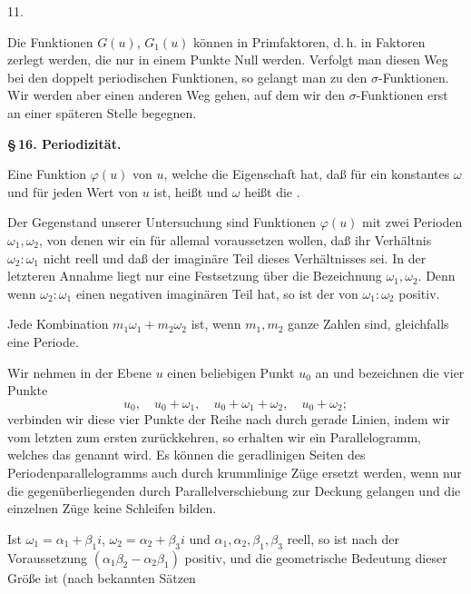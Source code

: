 
11. 

Die Funktionen $G(u)$, $G_1(u)$ können in Primfaktoren, d.\,h. in Faktoren zerlegt werden, die nur in einem Punkte Null werden. Verfolgt man diesen Weg bei den doppelt periodischen Funktionen, so gelangt man zu den  $\sigma$-Funktionen. Wir werden aber einen anderen Weg gehen, auf dem wir den $\sigma$-Funktionen erst an einer späteren Stelle begegnen.

\begin{center}
\textbf{\S\,16. Periodizit\"at.}
\end{center}

Eine Funktion $\varphi(u)$ von $u$, welche die Eigenschaft hat, daß für ein konstantes $\omega$ und für jeden Wert von $u$
ist, heißt  und $\omega$ heißt die .

Der Gegenstand unserer Untersuchung sind Funktionen $\varphi(u)$ mit zwei Perioden $\omega_1, \omega_2$, von denen wir ein für allemal voraussetzen wollen, daß ihr Verhältnis $\omega_2:\omega_1$ nicht reell und daß der imaginäre Teil dieses Verhältnisses  sei. In der letzteren Annahme liegt nur eine Festsetzung über die Bezeichnung $\omega_1, \omega_2$. Denn wenn $\omega_2:\omega_1$ einen negativen imaginären Teil hat, so ist der von $\omega_1:\omega_2$ positiv.

Jede Kombination $m_1\omega_1 + m_2\omega_2$ ist, wenn $m_1, m_2$ ganze Zahlen sind, gleichfalls eine Periode.

Wir nehmen in der Ebene $u$ einen beliebigen Punkt $u_0$ an und bezeichnen die vier Punkte
\[
u_0, \quad u_0 + \omega_1, \quad u_0 + \omega_1 + \omega_2, \quad u_0 + \omega_2;
\]
verbinden wir diese vier Punkte der Reihe nach durch gerade Linien, indem wir vom letzten zum ersten zurückkehren, so erhalten wir ein Parallelogramm, welches das  genannt wird. Es können die geradlinigen Seiten des Periodenparallelogramms auch durch krummlinige Züge ersetzt werden, wenn nur die gegenüberliegenden durch Parallelverschiebung zur Deckung gelangen und die einzelnen Züge keine Schleifen bilden.

Ist $\omega_1 = \alpha_1 + \beta_1 i$, $\omega_2 = \alpha_2 + \beta_3 i$ und $\alpha_1, \alpha_2, \beta_1, \beta_3$ reell, %
so ist nach der Voraussetzung $(\alpha_1\beta_2 - \alpha_2\beta_1)$ positiv, und die geometrische Bedeutung dieser Größe ist (nach bekannten Sätzen
